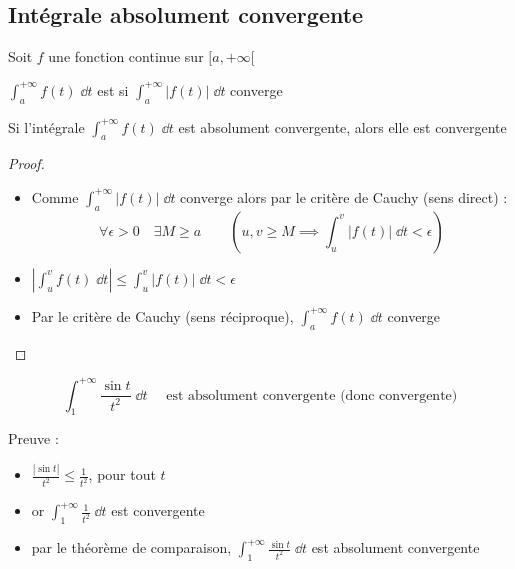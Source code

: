 \begin{frame}
\subsection{Intégrale absolument convergente}

Soit $f$ une fonction continue sur $[a,+\infty[$
\begin{mydefinition}
$\int_a^{+\infty} f(t)\;\dd t$ est  si 
$\int_a^{+\infty} \big|f(t)\big|\;\dd t$ converge
\end{mydefinition}

\pause

\begin{theoreme}
\label{th:acvimpliquecv}
Si l'intégrale $\int_a^{+\infty} f(t)\;\dd t$ est absolument
convergente, alors elle est convergente
\end{theoreme}

\pause

\begin{proof} 
\pause
\begin{itemize}
  \item Comme $\int_a^{+\infty} \big|f(t)\big| \; \dd t$ converge
alors par le critère de Cauchy (sens direct) :
\vspace*{-1ex}
$$\forall \epsilon>0  \quad \exists  M \ge a \qquad
\left( u,v \ge M \implies \int_u^v \big|f(t)\big| \;\dd t<\epsilon\right)$$
\vspace*{-2ex}
\pause  
  \item $\left|\int_u^v f(t) \;\dd t\right| \le \int_u^v \big|f(t)\big| \;\dd t < \epsilon$
\pause  
  \item Par le critère de Cauchy (sens réciproque),
$\int_a^{+\infty} f(t) \; \dd t$ converge \qedhere
\end{itemize}

\end{proof}
\end{frame}


\begin{frame}

\begin{exemple}
$$\int_1^{+\infty} \frac{\sin t}{t^2}\;\dd t\quad\text{ est absolument convergente (donc convergente)}$$

\pause
Preuve :\pause
\begin{itemize}
  \item $\frac{|\sin t |}{t^2}\le \frac{1}{t^2}$, pour tout $t$
\pause  
  \item or $\int_1^{+\infty} \frac{1}{t^2}\;\dd t$ est convergente
\pause   
  \item par le théorème de comparaison, $\int_1^{+\infty} \frac{\sin t}{t^2}\;\dd t$ est absolument convergente
\end{itemize}

\end{exemple}


\end{frame}



